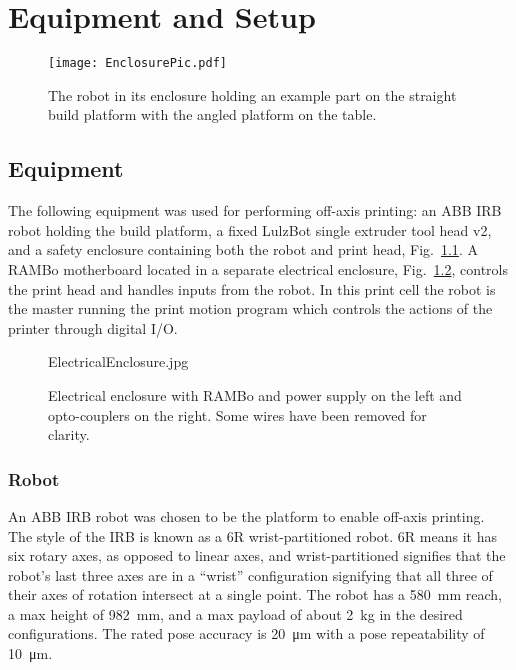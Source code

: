 \documentclass[main.tex]{subfiles}
\begin{document}
\chapter{Equipment and Setup}

\begin{figure}
\centering
	\texttt{[image: EnclosurePic.pdf]}
	\caption{The robot in its enclosure holding an example part on the straight build platform with the angled platform on the table.}
	\label{fig:enclosurepic}
\end{figure}

\section{Equipment}
The following equipment was used for performing off-axis printing: an ABB IRB robot holding the build platform, a fixed LulzBot single extruder tool head v2, and a safety enclosure containing both the robot and print head, Fig.~\ref{fig:enclosurepic}.
A RAMBo motherboard located in a separate electrical enclosure, Fig.~\ref{fig:elecenclosure}, controls the print head and handles inputs from the robot.
In this print cell the robot is the master running the print motion program which controls the actions of the printer through digital I/O.

\begin{figure}
\centering
	\begin{overpic}[width=0.9\textwidth, keepaspectratio]
		{ElectricalEnclosure.jpg}
	\end{overpic}
	\caption{Electrical enclosure with RAMBo and power supply on the left and opto-couplers on the right. Some wires have been removed for clarity.}
	\label{fig:elecenclosure}
\end{figure}

\subsection{Robot}
An ABB IRB robot was chosen to be the platform to enable off-axis printing.
The style of the IRB is known as a 6R wrist-partitioned robot. 
6R means it has six rotary axes, as opposed to linear axes, and wrist-partitioned signifies that the robot's last three axes are in a ``wrist'' configuration signifying that all three of their axes of rotation intersect at a single point.
The robot has a \SI{580}{mm} reach, a max height of \SI{982}{mm}, and a max payload of about \SI{2}{kg} in the desired configurations.
The rated pose accuracy is \SI{20}{\micro m} with a pose repeatability of \SI{10}{\micro m}.
\end{document}
